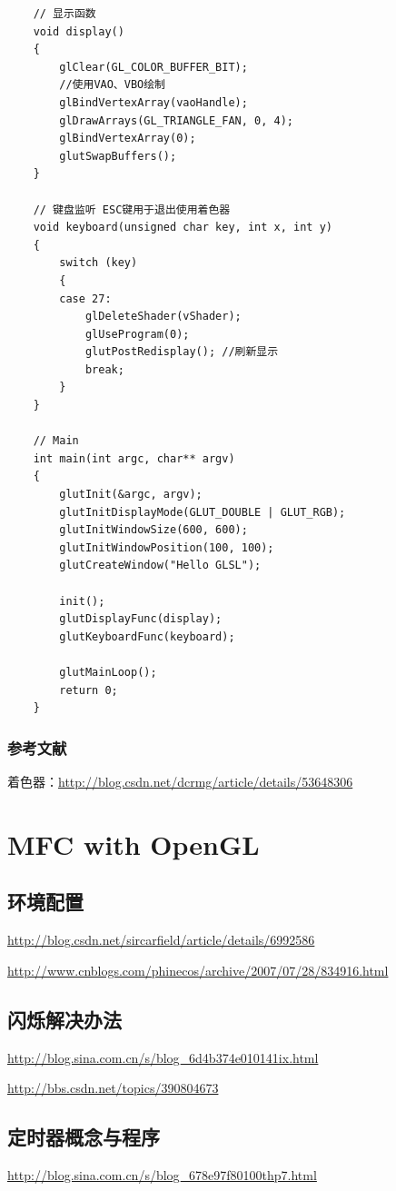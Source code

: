\documentclass[UTF8,a4paper,8pt]{ctexart}
\begin{document}
\begin{itemize}[itemindent = 1em]
\begin{lstlisting}
	// 显示函数
	void display()  
	{  
		glClear(GL_COLOR_BUFFER_BIT);  
		//使用VAO、VBO绘制    
		glBindVertexArray(vaoHandle);  
		glDrawArrays(GL_TRIANGLE_FAN, 0, 4);  
		glBindVertexArray(0);  
		glutSwapBuffers();  
	} 
	
	// 键盘监听 ESC键用于退出使用着色器  
	void keyboard(unsigned char key, int x, int y)  
	{  
		switch (key)  
		{  
		case 27:  
			glDeleteShader(vShader);  
			glUseProgram(0);  
			glutPostRedisplay(); //刷新显示  
			break;  
		}  
	}   
	
	// Main
	int main(int argc, char** argv)  
	{  
		glutInit(&argc, argv);  
		glutInitDisplayMode(GLUT_DOUBLE | GLUT_RGB);  
		glutInitWindowSize(600, 600);  
		glutInitWindowPosition(100, 100);  
		glutCreateWindow("Hello GLSL"); 
		 
		init();  
		glutDisplayFunc(display);  
		glutKeyboardFunc(keyboard); 
		 
		glutMainLoop();  
		return 0;  
	}  
							\end{lstlisting}
					\end{itemize}
					
		\subsubsection{参考文献}
			着色器：\url{http://blog.csdn.net/dcrmg/article/details/53648306}
\newpage			
\section{MFC with OpenGL}
	\subsection{环境配置}
		\url{http://blog.csdn.net/sircarfield/article/details/6992586}
		
		\url{http://www.cnblogs.com/phinecos/archive/2007/07/28/834916.html}
		
	\subsection{闪烁解决办法}
		\url{http://blog.sina.com.cn/s/blog_6d4b374e010141ix.html}
		    
		\url{http://bbs.csdn.net/topics/390804673}
			
	\subsection{定时器概念与程序}
		\url{http://blog.sina.com.cn/s/blog_678e97f80100thp7.html}
			
\end{document}
